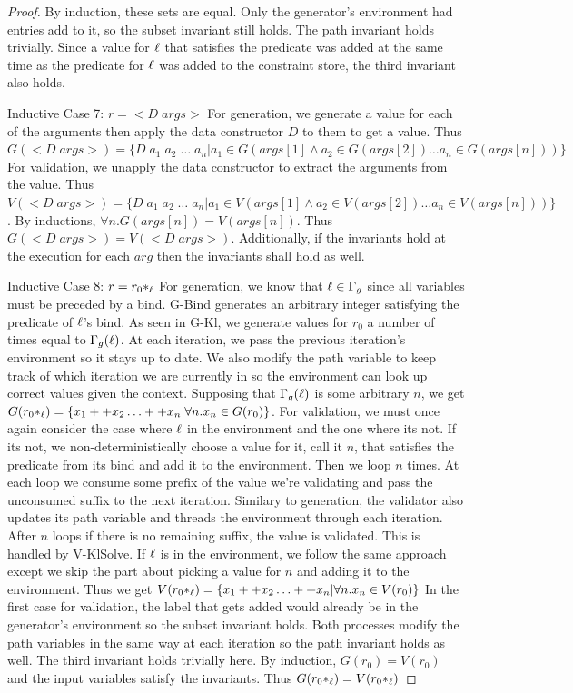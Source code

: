 \begin{proof}
        By induction, these sets are equal.
        Only the generator's environment had entries add to it, so the subset invariant still holds.
        The path invariant holds trivially.
        Since a value for $\ell$ that satisfies the predicate was added at the same time as the predicate for $\ell$ was added to the constraint store, the third invariant also holds. 
    \par Inductive Case 7: $r = <D\;args>$
        For generation, we generate a value for each of the arguments then apply the data constructor $D$ to them to get a value.
        Thus $G(<D\;args>) = \{D\;a_1\;a_2\;\dots\;a_n | a_1 \in G(args[1] \land a_2 \in G(args[2]) \dots a_n \in G(args[n]))\}$
        For validation, we unapply the data constructor to extract the arguments from the value.
        Thus $V(<D\;args>) = \{D\;a_1\;a_2\;\dots\;a_n | a_1 \in V(args[1] \land a_2 \in V(args[2]) \dots a_n \in V(args[n]))\}$.
        By inductions, $\forall n. G(args[n]) = V(args[n])$. Thus $G(<D\;args>) = V(<D\;args>)$.
        Additionally, if the invariants hold at the execution for each $arg$ then the invariants shall hold as well.
    \par Inductive Case 8: $r = r_0*_{\ell}$
        For generation, we know that $\ell \in \Gamma_g$ since all variables must be preceded by a bind.
        G-Bind generates an arbitrary integer satisfying the predicate of $\ell$'s bind.
        As seen in G-Kl, we generate values for $r_0$ a number of times equal to $\Gamma_g(\ell)$.
        At each iteration, we pass the previous iteration's environment so it stays up to date.
        We also modify the path variable to keep track of which iteration we are currently in so the environment can look up correct values given the context.
        Supposing that $\Gamma_g(\ell)$ is some arbitrary $n$, we get $G(r_0*_{\ell}) = \{x_1 ++ x_2 \dots ++ x_n | \forall n. x_n \in G(r_0)\}$.
        For validation, we must once again consider the case where $\ell$ in the environment and the one where its not.
        If its not, we non-deterministically choose a value for it, call it $n$, that satisfies the predicate from its bind and add it to the environment. 
        Then we loop $n$ times. At each loop we consume some prefix of the value we're validating and pass the unconsumed suffix to the next iteration.
        Similary to generation, the validator also updates its path variable and threads the environment through each iteration.
        After $n$ loops if there is no remaining suffix, the value is validated.
        This is handled by V-KlSolve.
        If $\ell$ is in the environment, we follow the same approach except we skip the part about picking a value for $n$ and adding it to the environment.
        Thus we get $V(r_0*_{\ell}) = \{x_1 ++ x_2 \dots ++ x_n | \forall n. x_n \in V(r_0)\}$
        In the first case for validation, the label that gets added would already be in the generator's environment so the subset invariant holds.
        Both processes modify the path variables in the same way at each iteration so the path invariant holds as well.
        The third invariant holds trivially here.
        By induction, $G(r_0) = V(r_0)$ and the input variables satisfy the invariants. Thus $G(r_0*_{\ell}) = V(r_0*_{\ell})$
    

\end{proof}
